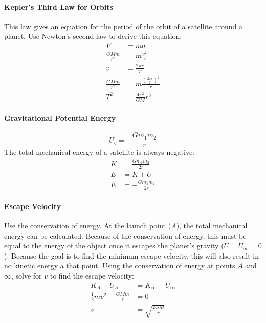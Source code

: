 \documentclass{article}
\begin{document}
            \paragraph{Kepler's Third Law for Orbits}
            This law gives an equation for the period of the orbit of a satellite around a planet. Use Newton's second law to derive this equation:
            \begin{align}
                F &= m a \nonumber\\
                \frac{G M m}{r^2} &= m \frac{v^2}{r} \nonumber\\
                v &= \frac{2 \pi r}{T} \nonumber\\
                \frac{G M m}{r^2} &= m \frac{\left( \frac{2 \pi r}{T} \right)^2}{r} \nonumber\\
                T^2 &= \frac{4 \pi^2}{GM} r^3
            \end{align}

            \paragraph{Gravitational Potential Energy}
            \begin{equation}
                U_g = - \frac{G m_1 m_2}{r}
            \end{equation}
            The total mechanical energy of a satellite is always negative:
            \begin{align}
                K &= \frac{G m_1 m_2}{2r} \\
                E &= K + U \nonumber\\
                E &= - \frac{G m_1 m_2}{2 r}
            \end{align}

            \paragraph{Escape Velocity}
            Use the conservation of energy. At the launch point ($A$), the total mechanical energy can be calculated. Because of the conservation of energy, this must be equal to the energy of the object once it escapes the planet's gravity ($U = U_\infty = 0$). Because the goal is to find the minimum escape velocity, this will also result in no kinetic energy a that point. Using the conservation of energy at points $A$ and $\infty$, solve for $v$ to find the escape velocity:
            \begin{align}
                K_A + U_A &= K_\infty + U_\infty \nonumber\\
                \frac{1}{2} m v^2 - \frac{G M m}{r} &= 0 \nonumber\\
                v &= \sqrt{\frac{2GM}{r}}
            \end{align}
\end{document}
